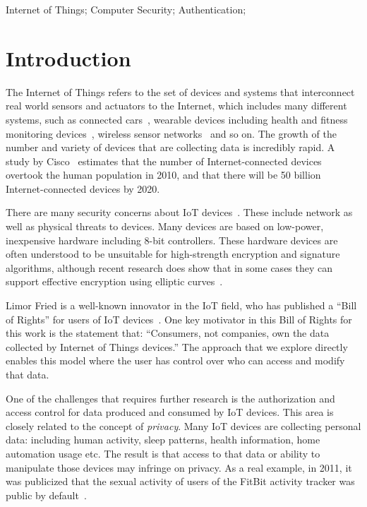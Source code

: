 \documentclass{IEEEtran}
\begin{document}
\begin{IEEEkeywords}
Internet of Things; Computer Security; Authentication; 
\end{IEEEkeywords}


\section{Introduction}
The Internet of Things refers to the set of devices and systems that interconnect real
world sensors and actuators to the Internet, which includes many different systems, such as 
connected cars~\cite{evans2005connected}, 
wearable devices including health and fitness monitoring devices~\cite{fitbit}, wireless sensor networks~\cite{lewis2004wireless} and so on.  The growth of the number and variety of devices that are collecting data is incredibly rapid.
A study by Cisco~\cite{evans2011internet} estimates that the number of Internet-connected devices
overtook the human population in 2010, and that there will be 50 billion Internet-connected devices 
by 2020. 

There are many security concerns about IoT devices~\cite{roman2011securing, draft-garcia}. These include 
network as well as physical threats to devices. Many devices are based on low-power, inexpensive
hardware including 8-bit controllers. These hardware devices are often understood to be 
unsuitable for high-strength 
encryption and signature algorithms, although recent research does show that in some cases they can 
support effective encryption using elliptic curves~\cite{sethi2012end, comparingECCRSA}. 

Limor Fried is a well-known innovator in the IoT field, who has published a ``Bill of Rights'' for
users of IoT devices~\cite{fried-bill-of-rights}. One key motivator in this Bill of Rights for this work is the  
statement that: ``Consumers, not companies, own the data collected by Internet of Things devices.'' The  
approach that we explore directly enables this model where the user has control over who can 
access and modify that data.

One of the challenges that requires further research is the authorization and access control
for data produced and consumed by IoT devices. This area is closely related to the concept
of \emph{privacy}. Many IoT devices are collecting personal 
data: including human activity, sleep patterns, health information, home automation usage etc. The result 
is that access to that data or ability to manipulate those devices may infringe on privacy. As a real example, in 2011, it was publicized that the sexual activity of users of the FitBit activity tracker was public by default~\cite{fitbitsex}.
\end{document}

